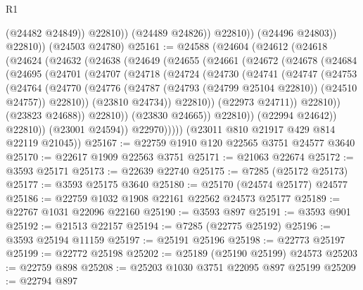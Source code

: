 \begin{lexlean}{R1}
\begin{coremodule}
                      (@24482 @24849))
                    @22810))
                (@24489 @24826))
              @22810))
          (@24496 @24803))
        @22810))
    (@24503 @24780)
@25161 := @24588
    (@24604
      (@24612
        (@24618
          (@24624
            (@24632
              (@24638
                (@24649
                  (@24655
                    (@24661
                      (@24672
                        (@24678
                          (@24684
                            (@24695
                              (@24701
                                (@24707
                                  (@24718
                                    (@24724
                                      (@24730
                                        (@24741
                                          (@24747
                                            (@24753
                                              (@24764
                                                (@24770
                                                  (@24776
                                                    (@24787
                                                      (@24793 (@24799 @25104 @22810))
                                                      (@24510 @24757))
                                                    @22810))
                                                (@23810 @24734))
                                              @22810))
                                          (@22973 @24711))
                                        @22810))
                                    (@23823 @24688))
                                  @22810))
                              (@23830 @24665))
                            @22810))
                        (@22994 @24642))
                      @22810))
                  (@23001 @24594))
                @22970)))))
      (@23011 @810 @21917 @429 @814 @22119 @21045))
@25167 := @22759 @1910 @120 @22565 @3751 @24577 @3640
@25170 := @22617 @1909 @22563 @3751
@25171 := @21063 @22674
@25172 := @3593 @25171
@25173 := @22639 @22740
@25175 := @7285 (@25172 @25173)
@25177 := @3593 @25175 @3640
@25180 := @25170 (@24574 @25177) @24577
@25186 := @22759 @1032 @1908 @22161 @22562 @24573 @25177
@25189 := @22767 @1031 @22096 @22160
@25190 := @3593 @897
@25191 := @3593 @901
@25192 := @21513 @22157
@25194 := @7285 (@22775 @25192)
@25196 := @3593 @25194 @11159
@25197 := @25191 @25196
@25198 := @22773 @25197
@25199 := @22772 @25198
@25202 := @25189 (@25190 @25199) @24573
@25203 := @22759 @898
@25208 := @25203 @1030 @3751 @22095 @897 @25199
@25209 := @22794 @897

\end{coremodule}
\end{lexlean}
